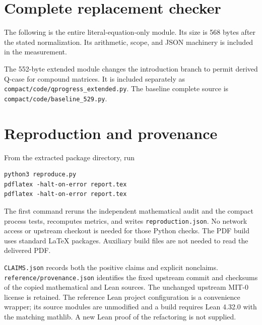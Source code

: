 \documentclass[11pt]{article}
\theoremstyle{definition}
\begin{document}
\appendix
\section{Complete replacement checker}

The following is the entire literal-equation-only module. Its size is
568 bytes after the stated normalization. Its arithmetic, scope, and JSON
machinery is included in the measurement.


The 552-byte extended module changes the introduction branch to permit
derived Q-case for compound matrices. It is included separately as
\texttt{compact/code/qprogress\_extended.py}. The baseline complete source
is \texttt{compact/code/baseline\_529.py}.

\section{Reproduction and provenance}

From the extracted package directory, run
\begin{lstlisting}
python3 reproduce.py
pdflatex -halt-on-error report.tex
pdflatex -halt-on-error report.tex
\end{lstlisting}
The first command reruns the independent mathematical audit and the compact
process tests, recomputes metrics, and writes \texttt{reproduction.json}.
No network access or upstream checkout is needed for those Python checks.
The PDF build uses standard LaTeX packages. Auxiliary build files are not
needed to read the delivered PDF.

\texttt{CLAIMS.json} records both the positive claims and explicit nonclaims.
\texttt{reference/provenance.json} identifies the fixed upstream commit and
checksums of the copied mathematical and Lean sources. The unchanged upstream
MIT-0 license is retained. The reference Lean project configuration is a
convenience wrapper; its source modules are unmodified and a build requires
Lean 4.32.0 with the matching mathlib. A new Lean proof of the refactoring is
not supplied.
\end{document}
